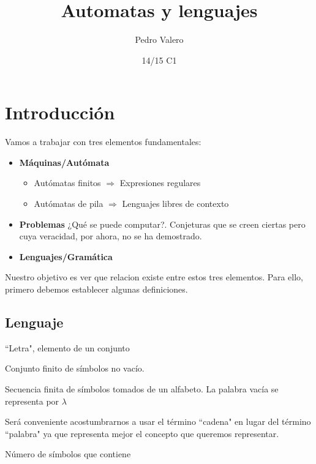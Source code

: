 \documentclass{apuntes}
\title{Automatas y lenguajes}
\author{Pedro Valero}
\date{14/15 C1}
\begin{document}
\pagestyle{plain}
\maketitle

\tableofcontents
\newpage

\printindex

\chapter{Introducción}
Vamos a trabajar con tres elementos fundamentales:
\begin{itemize}
\item \textbf{Máquinas/Autómata}
\begin{itemize}
\item Autómatas finitos $\Rightarrow$ Expresiones regulares
\item Autómatas de pila $\Rightarrow$ Lenguajes libres de contexto
\end{itemize}
\item \textbf{Problemas} ¿Qué se puede computar?. Conjeturas que se creen ciertas pero cuya veracidad, por ahora, no se ha demostrado.

\item \textbf{Lenguajes/Gramática}
\end{itemize}

Nuestro objetivo es ver que relacion existe entre estos tres elementos. Para ello, primero debemos establecer algunas definiciones.

\section{Lenguaje}
\begin{defn}[Símbolo]
``Letra", elemento de un conjunto
\end{defn}

\begin{defn}[Alfabeto]
Conjunto finito de símbolos no vacío.
\end{defn}

\begin{defn}
Secuencia finita de símbolos tomados de un alfabeto.
La palabra vacía se representa por $\lambda$
\end{defn}
Será conveniente acostumbrarnos a usar el término ``cadena" en lugar del término ``palabra" ya que representa mejor el concepto que queremos representar.


\begin{defn}
Número de símbolos que contiene
\end{defn}
\end{document}

